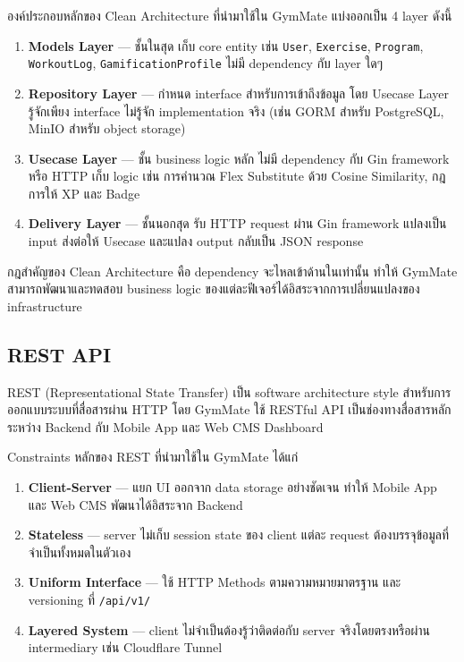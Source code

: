 องค์ประกอบหลักของ Clean Architecture ที่นำมาใช้ใน GymMate แบ่งออกเป็น 4 layer ดังนี้

\begin{enumerate}
  \item \textbf{Models Layer} — ชั้นในสุด เก็บ core entity เช่น \texttt{User}, \texttt{Exercise}, \texttt{Program}, \texttt{WorkoutLog}, \texttt{GamificationProfile} ไม่มี dependency กับ layer ใดๆ
  \item \textbf{Repository Layer} — กำหนด interface สำหรับการเข้าถึงข้อมูล โดย Usecase Layer รู้จักเพียง interface ไม่รู้จัก implementation จริง (เช่น GORM สำหรับ PostgreSQL, MinIO สำหรับ object storage)
  \item \textbf{Usecase Layer} — ชั้น business logic หลัก ไม่มี dependency กับ Gin framework หรือ HTTP เก็บ logic เช่น การคำนวณ Flex Substitute ด้วย Cosine Similarity, กฎการให้ XP และ Badge
  \item \textbf{Delivery Layer} — ชั้นนอกสุด รับ HTTP request ผ่าน Gin framework แปลงเป็น input ส่งต่อให้ Usecase และแปลง output กลับเป็น JSON response
\end{enumerate}

กฎสำคัญของ Clean Architecture คือ dependency จะไหลเข้าด้านในเท่านั้น ทำให้ GymMate สามารถพัฒนาและทดสอบ business logic ของแต่ละฟีเจอร์ได้อิสระจากการเปลี่ยนแปลงของ infrastructure

\subsection{REST API}
\label{subsec:rest-api}

REST (Representational State Transfer) เป็น software architecture style สำหรับการออกแบบระบบที่สื่อสารผ่าน HTTP โดย GymMate ใช้ RESTful API เป็นช่องทางสื่อสารหลักระหว่าง Backend กับ Mobile App และ Web CMS Dashboard

Constraints หลักของ REST ที่นำมาใช้ใน GymMate ได้แก่

\begin{enumerate}
  \item \textbf{Client-Server} — แยก UI ออกจาก data storage อย่างชัดเจน ทำให้ Mobile App และ Web CMS พัฒนาได้อิสระจาก Backend
  \item \textbf{Stateless} — server ไม่เก็บ session state ของ client แต่ละ request ต้องบรรจุข้อมูลที่จำเป็นทั้งหมดในตัวเอง
  \item \textbf{Uniform Interface} — ใช้ HTTP Methods ตามความหมายมาตรฐาน และ versioning ที่ \texttt{/api/v1/}
  \item \textbf{Layered System} — client ไม่จำเป็นต้องรู้ว่าติดต่อกับ server จริงโดยตรงหรือผ่าน intermediary เช่น Cloudflare Tunnel
\end{enumerate}

